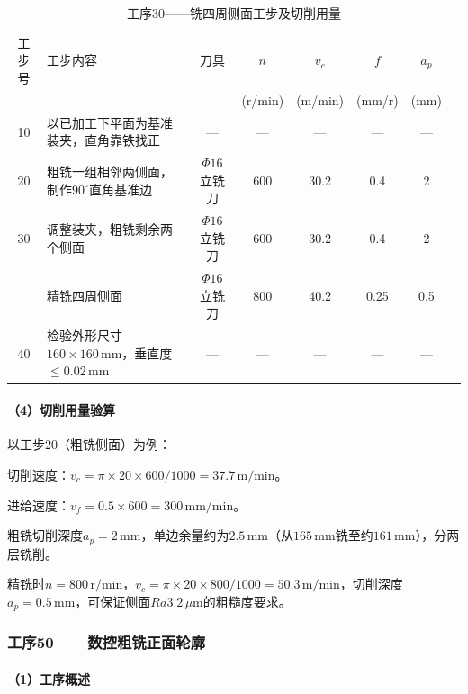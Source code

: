 \documentclass{xautCADreport}
\begin{document}
\begin{table}[H]
  \centering
  \caption{工序30——铣四周侧面工步及切削用量}
  \label{tab:op30_punch}
  \small
  \setlength{\tabcolsep}{5pt}
  \begin{tabular}{cp{4cm}cccccc}
    \toprule
    工步号 & 工步内容 & 刀具 & \multicolumn{1}{c}{$n$} & \multicolumn{1}{c}{$v_c$} & \multicolumn{1}{c}{$f$} & \multicolumn{1}{c}{$a_p$} \\
    & & & (r/min) & (m/min) & (mm/r) & (mm) \\
    \midrule
    10 & 以已加工下平面为基准装夹，直角靠铁找正 & — & — & — & — & — \\
    20 & 粗铣一组相邻两侧面，制作$90^{\circ}$直角基准边 & $\Phi16$立铣刀 & 600 & 30.2 & 0.4 & 2 \\
    30 & 调整装夹，粗铣剩余两个侧面 & $\Phi16$立铣刀 & 600 & 30.2 & 0.4 & 2 \\
    & 精铣四周侧面 & $\Phi16$立铣刀 & 800 & 40.2 & 0.25 & 0.5 \\
    40 & 检验外形尺寸$160\times160\,\mathrm{mm}$，垂直度$\leq0.02\,\mathrm{mm}$ & — & — & — & — & — \\
    \bottomrule
  \end{tabular}
\end{table}

\paragraph{（4）切削用量验算}

以工步20（粗铣侧面）为例：

切削速度：$v_c = \pi \times 20 \times 600 / 1000 = 37.7\,\mathrm{m/min}$。

进给速度：$v_f = 0.5 \times 600 = 300\,\mathrm{mm/min}$。

粗铣切削深度$a_p=2\,\mathrm{mm}$，单边余量约为$2.5\,\mathrm{mm}$（从$165\,\mathrm{mm}$铣至约$161\,\mathrm{mm}$），分两层铣削。

精铣时$n=800\,\mathrm{r/min}$，$v_c = \pi \times 20 \times 800 / 1000 = 50.3\,\mathrm{m/min}$，切削深度$a_p=0.5\,\mathrm{mm}$，可保证侧面$Ra3.2\,\mu\mathrm{m}$的粗糙度要求。

\subsubsection{工序50——数控粗铣正面轮廓}

\paragraph{（1）工序概述}
\end{document}
